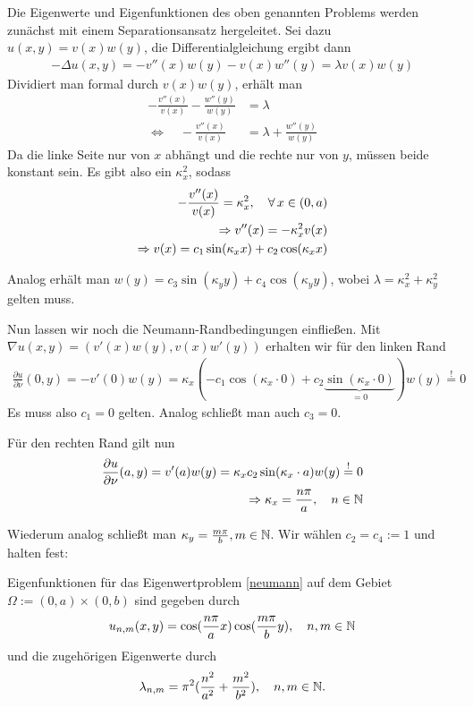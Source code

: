 \documentclass{article}
\begin{document}
Die Eigenwerte und Eigenfunktionen des oben genannten Problems werden zunächst mit einem Separationsansatz hergeleitet.
Sei dazu $u(x,y) = v(x)w(y)$, die Differentialgleichung ergibt dann
\begin{align*}
	- \Delta u(x,y) = -v''(x) w(y) - v(x) w''(y) = \lambda v(x)w(y)
\end{align*}
Dividiert man formal durch $v(x)w(y)$, erhält man
\begin{align*}
	-\frac{v''(x)}{v(x)} - \frac{w''(y)}{w(y)} &= \lambda \\
	\Leftrightarrow \quad -\frac{v''(x)}{v(x)} &= \lambda + \frac{w''(y)}{w(y)}
\end{align*}
Da die linke Seite nur von $x$ abhängt und die rechte nur von $y$, müssen beide konstant sein. Es gibt also ein $\kappa_{x}^2$, sodass
\begin{align*}
	-\frac{v''(x)}{v(x)} = \kappa_{x}^2, \quad \forall \, x \in (0,a) \\
	\Rightarrow v''(x) = -\kappa_{x}^2 v(x) \\
	\Rightarrow v(x) = c_1 \sin(\kappa_{x} x) + c_2 \cos(\kappa_{x} x)
\end{align*}

Analog erhält man $w(y) = c_3 \sin(\kappa_{y} y) + c_4 \cos(\kappa_{y} y)$, wobei $\lambda = \kappa_{x}^2 + \kappa_{y}^2$ gelten muss.

Nun lassen wir noch die Neumann-Randbedingungen einfließen. Mit $\nabla u(x,y) = (v'(x)w(y), v(x)w'(y))$ erhalten wir für den linken Rand
\begin{align*}
	\frac{\partial u}{\partial \nu}(0,y) = - v'(0)w(y) = \kappa_{x}(- c_1 \cos(\kappa_{x} \cdot 0) + c_2 \underbrace{\sin(\kappa_{x} \cdot 0)}_{=0})w(y) \stackrel{!}{=} 0
\end{align*}
Es muss also $c_1 = 0$ gelten. Analog schließt man auch $c_3 = 0$.

Für den rechten Rand gilt nun
\begin{align*}
	\frac{\partial u}{\partial \nu}(a,y) = v'(a)w(y) = \kappa_{x} c_2 \sin(\kappa_{x} \cdot a)w(y) \stackrel{!}{=} 0 \\
	\Rightarrow \kappa_x = \frac{n \pi}{a}, \quad n \in \mathbb{N}
\end{align*}

Wiederum analog schließt man $\kappa_y = \frac{m \pi}{b}, m \in \mathbb{N}$. Wir wählen $c_2 = c_4 := 1$ und halten fest:

\begin{theorem}
	Eigenfunktionen für das Eigenwertproblem \eqref{neumann} auf dem Gebiet $\Omega := (0,a) \times (0,b)$ sind gegeben durch
	\begin{align*}
		u_{n,m}(x,y) = \cos(\frac{n \pi}{a}x)\cos(\frac{m \pi}{b}y), \quad n,m \in \mathbb{N}
	\end{align*}
	und die zugehörigen Eigenwerte durch
	\begin{align*}
		\lambda_{n,m} = \pi^2(\frac{n^2}{a^2} + \frac{m^2}{b^2}), \quad n,m \in \mathbb{N}.
	\end{align*}
\end{theorem}
\end{document}
